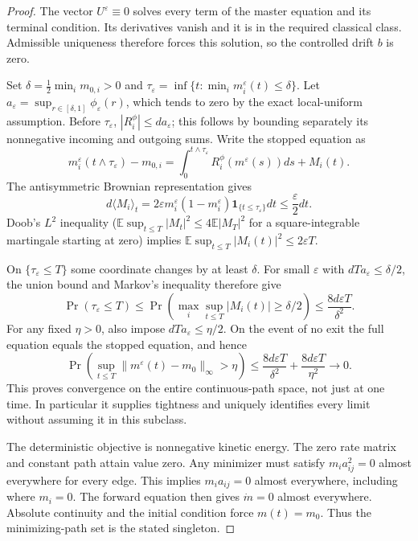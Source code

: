 \documentclass[11pt,a4paper]{article}
\theoremstyle{definition}
\theoremstyle{remark}
\begin{document}
\begin{proof}
The vector $U^\varepsilon\equiv0$ solves every term of the master equation and its terminal condition. Its derivatives vanish and it is in the required classical class. Admissible uniqueness therefore forces this solution, so the controlled drift $b$ is zero.

Set $\delta=\frac12\min_i m_{0,i}>0$ and
$\tau_\varepsilon=\inf\{t:\min_i m_i^\varepsilon(t)\leq\delta\}$.
Let $a_\varepsilon=\sup_{r\in[\delta,1]}\phi_\varepsilon(r)$, which tends to zero by the exact local-uniform assumption. Before $\tau_\varepsilon$, $|R_i^\phi|\leq d a_\varepsilon$; this follows by bounding separately its nonnegative incoming and outgoing sums. Write the stopped equation as
\[
 m_i^\varepsilon(t\wedge\tau_\varepsilon)-m_{0,i}
 =\int_0^{t\wedge\tau_\varepsilon}R_i^\phi(m^\varepsilon(s))ds+M_i(t).
\]
The antisymmetric Brownian representation gives
\[
 d\langle M_i\rangle_t
 =2\varepsilon m_i^\varepsilon(1-m_i^\varepsilon)
      \mathbf1_{\{t\leq\tau_\varepsilon\}}dt\leq\frac\varepsilon2dt.
\]
Doob's $L^2$ inequality ($\mathbb E\sup_{t\leq T}|M_t|^2\leq4\mathbb E|M_T|^2$ for a square-integrable martingale starting at zero) implies
$\mathbb E\sup_{t\leq T}|M_i(t)|^2\leq2\varepsilon T$.

On $\{\tau_\varepsilon\leq T\}$ some coordinate changes by at least $\delta$. For small $\varepsilon$ with $dTa_\varepsilon\leq\delta/2$, the union bound and Markov's inequality therefore give
\[
 \Pr(\tau_\varepsilon\leq T)\leq
 \Pr\left(\max_i\sup_{t\leq T}|M_i(t)|\geq\delta/2\right)
 \leq\frac{8d\varepsilon T}{\delta^2}.
\]
For any fixed $\eta>0$, also impose $dTa_\varepsilon\leq\eta/2$. On the event of no exit the full equation equals the stopped equation, and hence
\[
 \Pr\left(\sup_{t\leq T}\|m^\varepsilon(t)-m_0\|_\infty>\eta\right)
 \leq\frac{8d\varepsilon T}{\delta^2}
      +\frac{8d\varepsilon T}{\eta^2}\longrightarrow0.
\]
This proves convergence on the entire continuous-path space, not just at one time. In particular it supplies tightness and uniquely identifies every limit without assuming it in this subclass.

The deterministic objective is nonnegative kinetic energy. The zero rate matrix and constant path attain value zero. Any minimizer must satisfy $m_i a_{ij}^2=0$ almost everywhere for every edge. This implies $m_i a_{ij}=0$ almost everywhere, including where $m_i=0$. The forward equation then gives $\dot m=0$ almost everywhere. Absolute continuity and the initial condition force $m(t)=m_0$. Thus the minimizing-path set is the stated singleton.
\end{proof}
\end{document}
